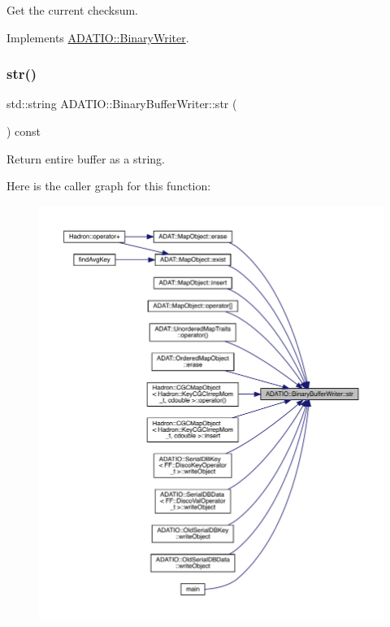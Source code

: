 Get the current checksum. 



Implements \mbox{\hyperlink{classADATIO_1_1BinaryWriter_ae64230370824192d1f0dbcaa8e74017a}{A\+D\+A\+T\+I\+O\+::\+Binary\+Writer}}.

\mbox{\label{classADATIO_1_1BinaryBufferWriter_a5c4f9b9c049173452e1cc70fe27ee188}} 
\subsubsection{\texorpdfstring{str()}{str()}\hspace{0.1cm}{\footnotesize\ttfamily [1/2]}}
{\footnotesize\ttfamily std\+::string A\+D\+A\+T\+I\+O\+::\+Binary\+Buffer\+Writer\+::str (\begin{DoxyParamCaption}{ }\end{DoxyParamCaption}) const}



Return entire buffer as a string. 

Here is the caller graph for this function\+:\nopagebreak
\begin{figure}[H]
\begin{center}
\leavevmode
\includegraphics[width=350pt]{d8/d90/classADATIO_1_1BinaryBufferWriter_a5c4f9b9c049173452e1cc70fe27ee188_icgraph}
\end{center}
\end{figure}
\mbox{\label{classADATIO_1_1BinaryBufferWriter_a5c4f9b9c049173452e1cc70fe27ee188}} 
